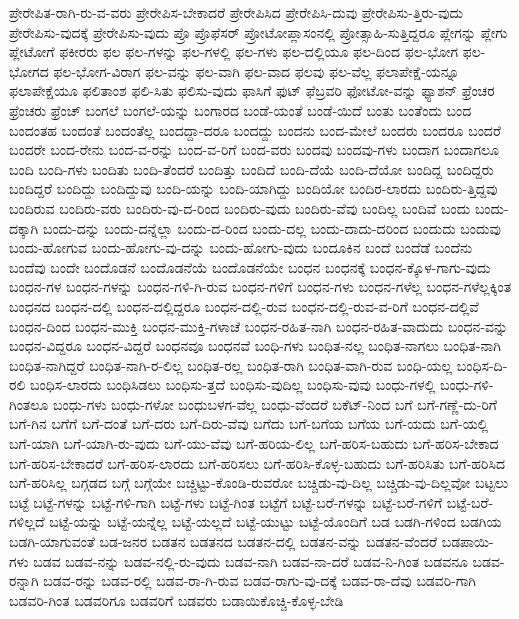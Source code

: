 {ಪ್ರೇರೇಪಿತ-ರಾಗಿ-ರು-ವ-ವರು
ಪ್ರೇರೇಪಿಸ-ಬೇಕಾದರೆ
ಪ್ರೇರೇಪಿಸಿದ
ಪ್ರೇರೇಪಿಸಿ-ದುವು
ಪ್ರೇರೇಪಿಸು-ತ್ತಿರು-ವುದು
ಪ್ರೇರೇಪಿಸು-ವುದಕ್ಕೆ
ಪ್ರೇರೇಪಿಸು-ವುದು
ಪ್ರೊ
ಪ್ರೊಫೆಸರ್
ಪ್ರೋಟೋಪ್ಲಾಸಂನಲ್ಲಿ
ಪ್ರೋತ್ಸಾಹಿ-ಸುತ್ತಿದ್ದರೂ
ಪ್ಲೇಗನ್ನು
ಪ್ಲೇಗು
ಪ್ಲೇಟೋಗೆ
ಫಕೀರರು
ಫಲ
ಫಲ-ಗಳನ್ನು
ಫಲ-ಗಳಲ್ಲಿ
ಫಲ-ಗಳು
ಫಲ-ದಲ್ಲಿಯೂ
ಫಲ-ದಿಂದ
ಫಲ-ಭೋಗ
ಫಲ-ಭೋಗದ
ಫಲ-ಭೋಗ-ವಿರಾಗ
ಫಲ-ವನ್ನು
ಫಲ-ವಾಗಿ
ಫಲ-ವಾದ
ಫಲವು
ಫಲ-ವೆಲ್ಲ
ಫಲಾಪೇಕ್ಷೆ-ಯನ್ನೂ
ಫಲಾಪೇಕ್ಷೆಯೂ
ಫಲಿತಾಂಶ
ಫಲಿ-ಸಿತು
ಫಲಿಸು-ವುದು
ಫಾಸಿಗೆ
ಫುಟ್
ಫೆಬ್ರವರಿ
ಫೋಟೋ-ವನ್ನು
ಫ್ಯಾಶನ್
ಫ್ರೆಂಚರ
ಫ್ರೆಂಚರು
ಫ್ರೆಂಚ್
ಬಂಗಲೆ
ಬಂಗಲೆ-ಯನ್ನು
ಬಂಗಾರದ
ಬಂಡೆ-ಯಂತೆ
ಬಂಡೆ-ಯಿದೆ
ಬಂತು
ಬಂತೆಂದು
ಬಂದ
ಬಂದಂತಹ
ಬಂದಂತೆ
ಬಂದಂತೆಲ್ಲ
ಬಂದದ್ದಾ-ದರೂ
ಬಂದದ್ದು
ಬಂದನು
ಬಂದ-ಮೇಲೆ
ಬಂದರು
ಬಂದರೂ
ಬಂದರೆ
ಬಂದರೇ
ಬಂದ-ರೇನು
ಬಂದ-ವ-ರನ್ನು
ಬಂದ-ವ-ರಿಗೆ
ಬಂದ-ವರು
ಬಂದವು
ಬಂದವು-ಗಳು
ಬಂದಾಗ
ಬಂದಾಗಲೂ
ಬಂದಿ
ಬಂದಿ-ಗಳು
ಬಂದಿತು
ಬಂದಿ-ತೆಂದರೆ
ಬಂದಿತ್ತು
ಬಂದಿದೆ
ಬಂದಿ-ದೆಯೆ
ಬಂದಿ-ದೆಯೋ
ಬಂದಿದ್ದ
ಬಂದಿದ್ದರು
ಬಂದಿದ್ದರೆ
ಬಂದಿದ್ದು
ಬಂದಿದ್ದುವು
ಬಂದಿ-ಯನ್ನು
ಬಂದಿ-ಯಾಗಿದ್ದು
ಬಂದಿಯೋ
ಬಂದಿರ-ಲಾರದು
ಬಂದಿರು-ತ್ತಿದ್ದವು
ಬಂದಿರುವ
ಬಂದಿರು-ವರು
ಬಂದಿರು-ವು-ದ-ರಿಂದ
ಬಂದಿರು-ವುದು
ಬಂದಿರು-ವೆವು
ಬಂದಿಲ್ಲ
ಬಂದಿವೆ
ಬಂದು
ಬಂದು-ದಕ್ಕಾಗಿ
ಬಂದು-ದನ್ನು
ಬಂದು-ದನ್ನೆಲ್ಲಾ
ಬಂದು-ದ-ರಿಂದ
ಬಂದು-ದಲ್ಲ
ಬಂದು-ದಾದು-ದರಿಂದ
ಬಂದುದು
ಬಂದುವು
ಬಂದು-ಹೋಗುವ
ಬಂದು-ಹೋಗು-ವು-ದನ್ನು
ಬಂದು-ಹೋಗು-ವುದು
ಬಂದೂಕಿನ
ಬಂದೆ
ಬಂದೆಡೆ
ಬಂದೆನು
ಬಂದೆವು
ಬಂದೇ
ಬಂದೊಡನೆ
ಬಂದೊಡನೆಯೆ
ಬಂದೊಡನೆಯೇ
ಬಂಧನ
ಬಂಧನಕ್ಕೆ
ಬಂಧನ-ಕ್ಕೊಳ-ಗಾಗು-ವುದು
ಬಂಧನ-ಗಳ
ಬಂಧನ-ಗಳನ್ನು
ಬಂಧನ-ಗಳಿ-ಗಿ-ರುವ
ಬಂಧನ-ಗಳಿಗೆ
ಬಂಧನ-ಗಳು
ಬಂಧನ-ಗಳೆಲ್ಲ
ಬಂಧನ-ಗಳೆಲ್ಲಕ್ಕಿಂತ
ಬಂಧನದ
ಬಂಧನ-ದಲ್ಲಿ
ಬಂಧನ-ದಲ್ಲಿದ್ದರೂ
ಬಂಧನ-ದಲ್ಲಿ-ರುವ
ಬಂಧನ-ದಲ್ಲಿ-ರುವ-ವ-ರಿಗೆ
ಬಂಧನ-ದಲ್ಲಿವೆ
ಬಂಧನ-ದಿಂದ
ಬಂಧನ-ಮುಕ್ತಿ
ಬಂಧನ-ಮುಕ್ತಿ-ಗಳಾಚೆ
ಬಂಧನ-ರಹಿತ-ನಾಗಿ
ಬಂಧನ-ರಹಿತ-ವಾದುದು
ಬಂಧನ-ವನ್ನು
ಬಂಧನ-ವಿದ್ದರೂ
ಬಂಧನ-ವಿದ್ದರೆ
ಬಂಧನವೂ
ಬಂಧನವೆ
ಬಂಧಿ-ಗಳು
ಬಂಧಿತ-ನಲ್ಲ
ಬಂಧಿತ-ನಾಗಲು
ಬಂಧಿತ-ನಾಗಿ
ಬಂಧಿತ-ನಾಗಿದ್ದರೆ
ಬಂಧಿತ-ನಾಗಿ-ರ-ಲಿಲ್ಲ
ಬಂಧಿತ-ರಲ್ಲ
ಬಂಧಿತ-ರಾಗಿ
ಬಂಧಿತ-ವಾಗಿ-ರುವ
ಬಂಧಿ-ಯಲ್ಲ
ಬಂಧಿಸ-ದಿ-ರಲಿ
ಬಂಧಿಸ-ಲಾರದು
ಬಂಧಿಸಿಡಲು
ಬಂಧಿಸು-ತ್ತದೆ
ಬಂಧಿಸು-ವುದಿಲ್ಲ
ಬಂಧಿಸು-ವುವು
ಬಂಧು-ಗಳಲ್ಲಿ
ಬಂಧು-ಗಳಿ-ಗಿಂತಲೂ
ಬಂಧು-ಗಳು
ಬಂಧು-ಗಳೋ
ಬಂಧುಬಳಗ-ವೆಲ್ಲ
ಬಂಧು-ವೆಂದರೆ
ಬಕೆಟ್-ನಿಂದ
ಬಗೆ
ಬಗೆ-ಗಣ್ಣೆ-ದು-ರಿಗೆ
ಬಗೆ-ಗಿನ
ಬಗೆಗೆ
ಬಗೆ-ದಂತೆ
ಬಗೆ-ದರು
ಬಗೆ-ದಿರು-ವೆವು
ಬಗೆದು
ಬಗೆ-ಬಗೆಯ
ಬಗೆಯ
ಬಗೆ-ಯದು
ಬಗೆ-ಯಲ್ಲಿ
ಬಗೆ-ಯಾಗಿ
ಬಗೆ-ಯಾಗಿ-ರು-ವುದು
ಬಗೆ-ಯು-ವೆವು
ಬಗೆ-ಹರಿಯ-ಲಿಲ್ಲ
ಬಗೆ-ಹರಿಸ-ಬಹುದು
ಬಗೆ-ಹರಿಸ-ಬೇಕಾದ
ಬಗೆ-ಹರಿಸ-ಬೇಕಾದರೆ
ಬಗೆ-ಹರಿಸ-ಲಾರದು
ಬಗೆ-ಹರಿಸಲು
ಬಗೆ-ಹರಿಸಿ-ಕೊಳ್ಳ-ಬಹುದು
ಬಗೆ-ಹರಿಸಿತು
ಬಗೆ-ಹರಿಸಿದ
ಬಗೆ-ಹರಿಸಿಲ್ಲ
ಬಗ್ಗಡದ
ಬಗ್ಗೆ
ಬಗ್ಗೆಯೇ
ಬಚ್ಚಿಟ್ಟು-ಕೊಂಡಿ-ರುವರೋ
ಬಚ್ಚಿಡು-ವು-ದಿಲ್ಲ
ಬಚ್ಚಿಡು-ವು-ದಿಲ್ಲವೋ
ಬಟ್ಟಲು
ಬಟ್ಟೆ
ಬಟ್ಟೆ-ಗಳನ್ನು
ಬಟ್ಟೆ-ಗಳಿ-ಗಾಗಿ
ಬಟ್ಟೆ-ಗಳು
ಬಟ್ಟೆ-ಗಿಂತ
ಬಟ್ಟೆಗೆ
ಬಟ್ಟೆ-ಬರೆ-ಗಳನ್ನು
ಬಟ್ಟೆ-ಬರೆ-ಗಳಿಗೆ
ಬಟ್ಟೆ-ಬರೆ-ಗಳಿಲ್ಲದೆ
ಬಟ್ಟೆ-ಯನ್ನು
ಬಟ್ಟೆ-ಯನ್ನೆಲ್ಲ
ಬಟ್ಟೆ-ಯಲ್ಲದೆ
ಬಟ್ಟೆ-ಯುಟ್ಟು
ಬಟ್ಟೆ-ಯೊಂದಿಗೆ
ಬಡ
ಬಡಗಿ-ಗಳಿಂದ
ಬಡಗಿಯ
ಬಡಗಿ-ಯಾಗುವಂತೆ
ಬಡ-ಜನರ
ಬಡತನ
ಬಡತನದ
ಬಡತನ-ದಲ್ಲಿ
ಬಡತನ-ವನ್ನು
ಬಡತನ-ವೆಂದರೆ
ಬಡಪಾಯಿ-ಗಳು
ಬಡವ
ಬಡವ-ನನ್ನು
ಬಡವ-ನಲ್ಲಿ-ರು-ವುದು
ಬಡವ-ನಾಗಿ
ಬಡವ-ನಾ-ದರೆ
ಬಡವ-ನಿ-ಗಿಂತ
ಬಡವನೂ
ಬಡವ-ರನ್ನಾಗಿ
ಬಡವ-ರನ್ನು
ಬಡವ-ರಲ್ಲಿ
ಬಡವ-ರಾ-ಗಿ-ರುವ
ಬಡವ-ರಾಗು-ವು-ದಕ್ಕೆ
ಬಡವ-ರಾ-ದೆವು
ಬಡವರಿ-ಗಾಗಿ
ಬಡವರಿ-ಗಿಂತ
ಬಡವರಿಗೂ
ಬಡವರಿಗೆ
ಬಡವರು
ಬಡಾಯಿಕೊಚ್ಚಿ-ಕೊಳ್ಳ-ಬೇಡಿ
}
